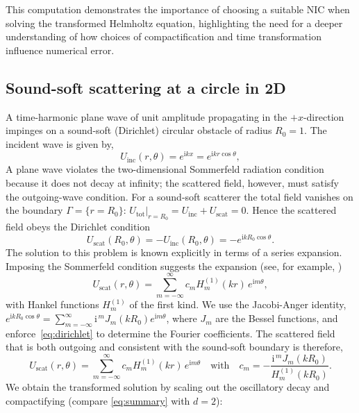 \documentclass[onefignum,onetabnum]{siamart190516}
\begin{document}
This computation demonstrates the importance of choosing a suitable NIC when solving the transformed Helmholtz equation, highlighting the need for a deeper understanding of how choices of compactification and time transformation influence numerical error.

\subsection{Sound-soft scattering at a circle in 2D}

A time-harmonic plane wave of unit amplitude propagating in the $+x$-direction impinges on a sound-soft (Dirichlet) circular obstacle of radius $R_0=1$. The incident wave is given by, 
\[
U_{\mathrm{inc}}(r,\theta)=e^{\mathrm{i}k x}=e^{\mathrm{i}k r\cos\theta},
\]
A plane wave violates the two-dimensional Sommerfeld radiation condition because it does not decay at infinity; the scattered field, however, must satisfy the outgoing-wave condition. For a sound-soft scatterer the total field vanishes on the boundary $\Gamma=\{r=R_0\}$: $ U_{\mathrm{tot}}|_{r=R_0}=U_{\mathrm{inc}}+U_{\mathrm{scat}}=0$.
Hence the scattered field obeys the Dirichlet condition
\begin{equation}\label{eq:dirichlet}
   U_{\mathrm{scat}}(R_0,\theta)=-U_{\mathrm{inc}}(R_0,\theta)
   =-e^{\mathrm{i}k R_0\cos\theta}.
\end{equation}
The solution to this problem is known explicitly in terms of a series expansion. Imposing the Sommerfeld condition suggests the expansion (see, for example, \cite{britt2010compact, yang2021truly})
\[
U_{\mathrm{scat}}(r,\theta)=\sum_{m=-\infty}^{\infty} c_m
   H^{(1)}_{m}(k r)\,e^{\mathrm{i}m\theta},
\]
with Hankel functions $H^{(1)}_{m}$ of the first kind.  We use the Jacobi-Anger identity,
$e^{\mathrm{i}kR_0\cos\theta}=\sum_{m=-\infty}^{\infty}\mathrm{i}^{\,m}J_m(kR_0)e^{\mathrm{i}m\theta}$, where $J_m$ are the Bessel functions, and enforce~\eqref{eq:dirichlet} to determine the Fourier coefficients.
The scattered field that is both outgoing and consistent with the sound-soft boundary is therefore,
\begin{equation}\label{eqn:2Dsolution}
U_{\mathrm{scat}}(r,\theta)= \sum_{m=-\infty}^{\infty}
     c_m H_m^{(1)}(k r)\,e^{\mathrm{i}m\theta} \quad \mathrm{with} \quad 
	 c_m = -\frac{\mathrm{i}^{\,m}J_m(kR_0)}{H_m^{(1)}(kR_0)}.
\end{equation}
We obtain the transformed solution by scaling out the oscillatory decay and compactifying (compare \eqref{eq:summary} with $d=2$):
\end{document}
